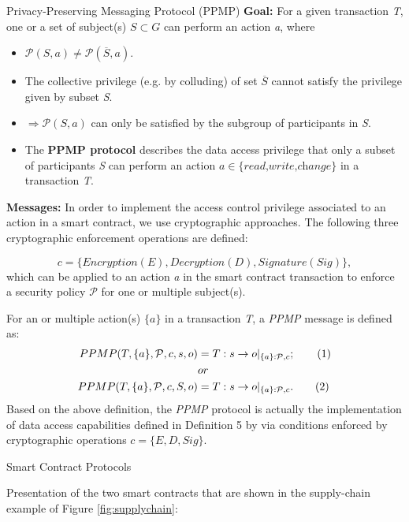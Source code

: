 \documentclass[11pt]{beamer}
\begin{document}
\begin{frame}[allowframebreaks]{Privacy-Preserving Messaging Protocol (PPMP)}
\textbf{Goal:} For a given transaction \textit{T}, one or a set of subject(s) $S \subset G$ can perform an action \textit{a}, where
\begin{itemize}
\item $\mathcal{P}(S,a) \neq \mathcal{P}(\overline{S},a)$.
\item The collective privilege (e.g. by colluding) of set $\overline{S}$ cannot satisfy the privilege given by subset \textit{S}.
\item $\Rightarrow \mathcal{P}(S,a)$ can only be satisfied by the subgroup of participants in \textit{S}.
\item The \textbf{PPMP protocol} describes the data access privilege that only a subset of participants \textit{S} can perform an action $a \in \{\textit{read,write,change}\}$ in a transaction \textit{T}.
\end{itemize}
\textbf{Messages:} In order to implement the access control privilege associated to an action in a smart contract, we use cryptographic approaches. The following three cryptographic enforcement operations are defined:

\[c = \{Encryption(E), Decryption(D), Signature(Sig)\},\] which can be applied to an action \textit{a} in the smart contract transaction to enforce a security policy $\mathcal{P}$ for one or multiple subject(s).

For an or multiple action(s) $\{a\}$ in a transaction \textit{T}, a \textit{PPMP} message is defined as:
\begin{align*}
PPMP(T, \{a\}, \mathcal{P}, c, s, o) &= T: s \rightarrow o|_{\{a\}:\mathcal{P},c}; \stepcounter{equation}\tag{\theequation}\label{ppmpeq1}\\
									  & or\\
PPMP(T, \{a\}, \mathcal{P}, c, S, o) &= T: s \rightarrow o|_{\{a\}:\mathcal{P},c}. \stepcounter{equation}\tag{\theequation}\label{ppmpeq2}
\end{align*}
Based on the above definition, the \textit{PPMP} protocol is actually the implementation of data access capabilities defined in Definition 5 by via conditions enforced by cryptographic operations $c = \{E, D, Sig\}$.
\end{frame}

\begin{frame}{Smart Contract Protocols}

Presentation of the two smart contracts that are shown in the supply-chain example of Figure \ref{fig:supplychain}:

\end{frame}
\end{document}
